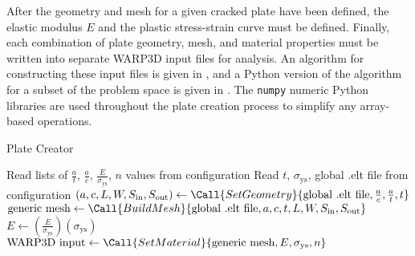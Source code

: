After the geometry and mesh for a given cracked plate have been defined, the elastic modulus \(E\) and the plastic stress-strain curve must be defined.
Finally, each combination of plate geometry, mesh, and material properties must be written into separate WARP3D input files for analysis.
An algorithm for constructing these input files is given in , and a Python version of the algorithm for a subset of the problem space is given in .
The \verb|numpy| numeric Python libraries \cite{numpy} are used throughout the plate creation process to simplify any array-based operations. 
\begin{algorithm}[tbp]
  \caption{Plate Creator}
  \label{alg:plate-creator}
  \begin{algorithmic}
     
    \State Read lists of $\frac{a}{t}$, $\frac{a}{c}$, $\frac{E}{\sigma_{\text{ys}}}$, $n$ values from configuration
    \State {}
    \State Read $t$, $\sigma_\text{ys}$, global .elt file from configuration
    \State {}
      \State $(a, c, L, W, S_{\text{in}}, S_{\text{out}}) \gets \Call{Set Geometry}{\text{global .elt file}, \frac{a}{c}, \frac{a}{t}, t}$
      \State $\text{generic mesh} \gets \Call{Build Mesh}{\text{global .elt file}, a, c, t, L, W, S_{\text{in}}, S_{\text{out}}}$
      \State {}
        \State $E \gets (\frac{E}{\sigma_\text{ys}})(\sigma_\text{ys})$
        \State $\text{WARP3D input} \gets \Call{Set Material}{\text{generic mesh}, E, \sigma_\text{ys}, n}$
        \State {}
      \EndFor
    \EndFor
    \EndProcedure
  \end{algorithmic}
\end{algorithm}

